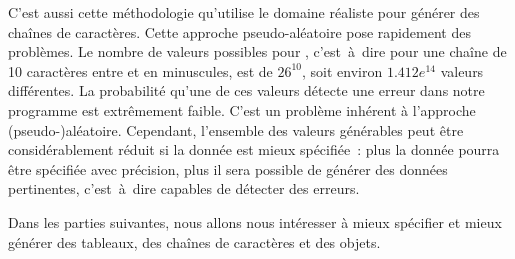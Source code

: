C'est aussi cette méthodologie qu'utilise le domaine réaliste  pour
générer des chaînes de caractères. Cette approche pseudo-aléatoire pose
rapidement des problèmes. Le nombre de valeurs possibles pour , c'est~à~dire pour une chaîne de 10 caractères entre  et
 en minuscules, est de $26^{10}$, soit environ $1.412e^{14}$ valeurs
différentes. La probabilité qu'une de ces valeurs détecte une erreur dans notre
programme est extrêmement faible. C'est un problème inhérent à l'approche
(pseudo-)aléatoire. Cependant, l'ensemble des valeurs générables peut être
considérablement réduit si la donnée est mieux spécifiée~: plus la donnée pourra
être spécifiée avec précision, plus il sera possible de générer des données
pertinentes, c'est~à~dire capables de détecter des erreurs.

Dans les parties suivantes, nous allons nous intéresser à mieux spécifier et
mieux générer des tableaux, des chaînes de caractères et des objets.
